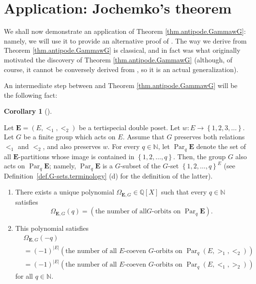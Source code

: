 \documentclass[numbers=enddot,12pt,final,onecolumn,notitlepage,abstracton]{scrartcl}
\theoremstyle{definition}
\newtheorem{coro}[theo]{Corollary}
\newenvironment{corollary}[1][]
{\begin{coro}[#1]\begin{leftbar}}
{\end{leftbar}\end{coro}}
\newcommand{\Par}{\operatorname{Par}}
\newcommand{\EE}{{\mathbf{E}}}
\newcommand{\NN}{{\mathbb{N}}}
\newcommand{\QQ}{{\mathbb{Q}}}
\begin{document}
\section{Application: Jochemko's theorem}
\label{sect.jochemko}

We shall now demonstrate an application of Theorem \ref{thm.antipode.GammawG}:
namely, we will use it to provide an alternative proof of \cite[Theorem
2.13]{Joch}. The way we derive \cite[Theorem 2.13]{Joch} from Theorem
\ref{thm.antipode.GammawG} is classical, and in fact was what originally
motivated the discovery of Theorem \ref{thm.antipode.GammawG} (although, of
course, it cannot be conversely derived from \cite[Theorem 2.13]{Joch}, so it
is an actual generalization).

An intermediate step between \cite[Theorem 2.13]{Joch} and Theorem
\ref{thm.antipode.GammawG} will be the following fact:

\begin{corollary}
\label{cor.reciprocity.GammawG}Let $ \EE =\left(  E,<_{1},<_{2}\right)
$ be a tertispecial double poset. Let $w:E\rightarrow\left\{  1,2,3,\ldots
\right\}  $. Let $G$ be a finite group which acts on $E$. Assume that $G$
preserves both relations $<_{1}$ and $<_{2}$, and also preserves $w$. For
every $q\in \NN $, let $\Par_q \EE$
denote the set of all $\EE$-partitions whose image is contained in
$\left\{  1,2,\ldots,q\right\}  $. Then, the group $G$ also acts on
$\Par_q \EE$; namely,
$\Par_q \EE$ is a $G$-subset of the $G$-set $\left\{  1,2,\ldots
,q\right\}  ^{E}$ (see Definition~\ref{def.G-sets.terminology} (d) for the
definition of the latter).

\begin{enumerate}
\item[(a)] There exists a unique polynomial $\Omega_{\EE, G}
\in \QQ \left[  X\right]  $ such that every $q\in \NN $ satisfies%
\begin{equation}
\Omega_{\EE, G}\left(  q\right)  =\left(  \text{the number of all
}G\text{-orbits on } \Par_q \EE \right)  .
\label{eq.cor.reciprocity.GammawG.a.def}
\end{equation}


\item[(b)] This polynomial satisfies%
\begin{align}
&  \Omega_{\EE,G}\left(  -q\right) \nonumber\\
&  =\left(  -1\right)  ^{\left\vert E\right\vert }\left(  \text{the number of
all $E$-coeven }G\text{-orbits on } \Par_q \left(
E,>_{1},<_{2}\right)  \right) \nonumber\\
&  =\left(  -1\right)  ^{\left\vert E\right\vert }\left(  \text{the number of
all $E$-coeven }G\text{-orbits on } \Par_q \left(
E,<_{1},>_{2}\right)  \right)
\label{eq.cor.reciprocity.GammawG.b.2}
\end{align}
for all $q\in \NN $.
\end{enumerate}
\end{corollary}
\end{document}
